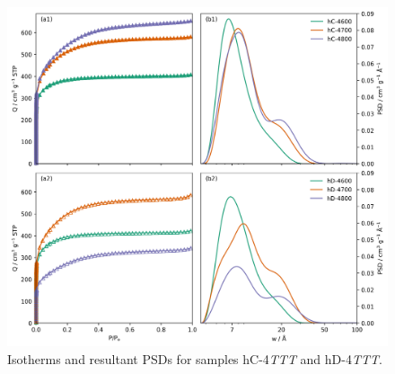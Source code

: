 \begin{figure}[ht!]
    \centering
    \includegraphics[width=\columnwidth, keepaspectratio]{4-cbs/figs/CB_n2_isotherms.png}
    \caption{Isotherms and resultant PSDs for samples hC-4\textit{TTT} and hD-4\textit{TTT}.}
    \label{fig:cb_isopsd}
\end{figure}

